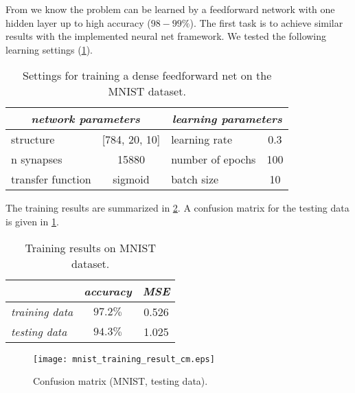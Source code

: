 From \citep{lecun:mnist} we know the problem can be learned by a feedforward network with one hidden layer up to high accuracy ($ 98-99\% $). The first task is to achieve similar results with the implemented neural net framework. We tested the following learning settings (\cref{tab:examples:mnist_training_settings}).

\begin{table}[H]
\centering
\begin{tabular}{|l|c|l|c|}
\hline
\multicolumn{2}{|c|}{\textit{network parameters}} & \multicolumn{2}{c|}{\textit{learning parameters}} \\ \hline
structure               & {[}784, 20, 10{]}       & learning rate                  & 0.3              \\ \hline
n synapses              & 15880                   & number of epochs               & 100              \\ \hline
transfer function       & sigmoid                 & batch size               & 10              \\ \hline
\end{tabular}
\caption{Settings for training a dense feedforward net on the MNIST dataset.}
\label{tab:examples:mnist_training_settings}
\end{table}

The training results are summarized in \cref{tab:examples:mnist_training_results}. A confusion matrix for the testing data is given in \cref{fig:examples:mnist_cm}.

\begin{table}[H]
\centering
\begin{tabular}{|l|c|c|}
\hline
                       & \multicolumn{1}{l|}{\textit{accuracy}} & \multicolumn{1}{l|}{\textit{MSE}} \\ \hline
\textit{training data} & $ 97.2\% $                                      & 0.526                                 \\ \hline
\textit{testing data}  & $ 94.3\% $                                      & 1.025                                 \\ \hline
\end{tabular}
\caption{Training results on MNIST dataset.}
\label{tab:examples:mnist_training_results}
\end{table}

\begin{figure}[H]
\centering
\texttt{[image: mnist\_training\_result\_cm.eps]}
\caption{Confusion matrix (MNIST, testing data).}
\label{fig:examples:mnist_cm}
\end{figure}

